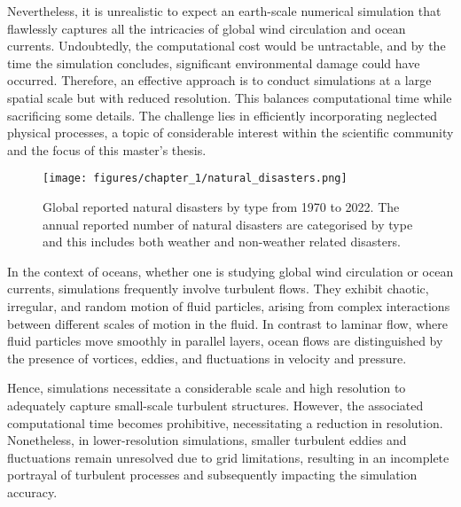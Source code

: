 Nevertheless, it is unrealistic to expect an earth-scale numerical simulation that flawlessly captures all the intricacies of global wind circulation and ocean currents. Undoubtedly, the computational cost would be untractable, and by the time the simulation concludes, significant environmental damage could have occurred. Therefore, an effective approach is to conduct simulations at a large spatial scale but with reduced resolution. This balances computational time while sacrificing some details. The challenge lies in efficiently incorporating neglected physical processes, a topic of considerable interest within the scientific community and the focus of this master's thesis.

\newpage

\begin{figure}[!t]
    \centering
    \texttt{[image: figures/chapter\_1/natural\_disasters.png]}
    \caption{Global reported natural disasters by type from 1970 to 2022. The annual reported number of natural disasters are categorised by type and this includes both weather and non-weather
related disasters.}
    \label{C1 - FIG - Subfilter quantities global reported natural disasters by type, 1970 to 2022}
\end{figure}


In the context of oceans, whether one is studying global wind circulation or ocean currents, simulations frequently involve turbulent flows. They exhibit chaotic, irregular, and random motion of fluid particles, arising from complex interactions between different scales of motion in the fluid. In contrast to laminar flow, where fluid particles move smoothly in parallel layers, ocean flows are distinguished by the presence of vortices, eddies, and fluctuations in velocity and pressure.\\

\vspace{0.5em}

Hence, simulations necessitate a considerable scale and high resolution to adequately capture small-scale turbulent structures. However, the associated computational time becomes prohibitive, necessitating a reduction in resolution. Nonetheless, in lower-resolution simulations, smaller turbulent eddies and fluctuations remain unresolved due to grid limitations, resulting in an incomplete portrayal of turbulent processes and subsequently impacting the simulation accuracy.\\

